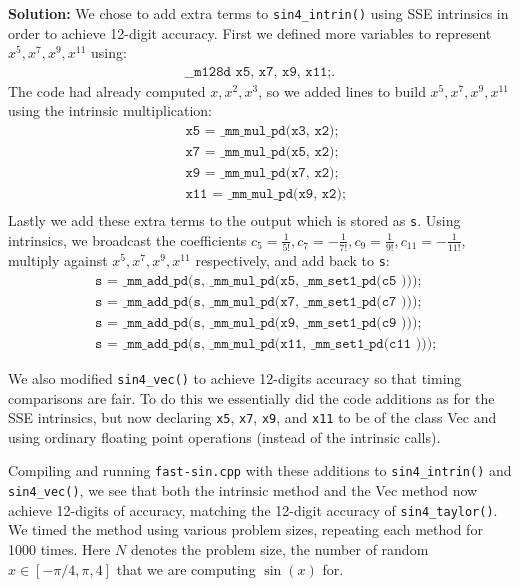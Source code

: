 \documentclass[10pt]{article}
\begin{document}
\begin{enumerate}
\textbf{Solution:} We chose to add extra terms to \texttt{sin4\_intrin()} using SSE intrinsics in order to achieve 12-digit accuracy. First we defined more variables to represent $x^{5}, x^{7}, x^{9}, x^{11}$ using:
\begin{align*}
\texttt{\_\_m128d x5, x7, x9, x11;}. 
\end{align*}
The code had already computed $x, x^{2}, x^{3}$, so we added lines to build $x^{5}, x^{7}, x^{9}, x^{11}$ using the intrinsic multiplication:
\begin{align*}
    &\texttt{x5  = \_mm\_mul\_pd(x3, x2);}\\
    &\texttt{x7  = \_mm\_mul\_pd(x5, x2);}\\
    &\texttt{x9  = \_mm\_mul\_pd(x7, x2);}\\
    &\texttt{x11 = \_mm\_mul\_pd(x9, x2);}\\
\end{align*}
Lastly we add these extra terms to the output which is stored as \texttt{s}. Using intrinsics, we broadcast the coefficients $c_{5} = \frac{1}{5!}, c_{7} = -\frac{1}{7!}, c_{9} = \frac{1}{9!}, c_{11} = -\frac{1}{11!}$, multiply against $x^{5}, x^{7}, x^{9}, x^{11}$ respectively, and add back to \texttt{s}:
\begin{align*}
    &\texttt{s = \_mm\_add\_pd(s, \_mm\_mul\_pd(x5,  \_mm\_set1\_pd(c5 )));}\\
    &\texttt{s = \_mm\_add\_pd(s, \_mm\_mul\_pd(x7,  \_mm\_set1\_pd(c7 )));}\\
    &\texttt{s = \_mm\_add\_pd(s, \_mm\_mul\_pd(x9,  \_mm\_set1\_pd(c9 )));}\\
    &\texttt{s = \_mm\_add\_pd(s, \_mm\_mul\_pd(x11,  \_mm\_set1\_pd(c11 )));}
\end{align*}

We also modified \texttt{sin4\_vec()} to achieve 12-digits accuracy so that timing comparisons are fair. To do this we essentially did the code additions as for the SSE intrinsics, but now declaring \texttt{x5}, \texttt{x7}, \texttt{x9}, and \texttt{x11} to be of the class Vec and using ordinary floating point operations (instead of the intrinsic calls).

Compiling and running \texttt{fast-sin.cpp} with these additions to \texttt{sin4\_intrin()} and \texttt{sin4\_vec()}, we see that both the intrinsic method and the Vec method now achieve 12-digits of accuracy, matching the 12-digit accuracy of \texttt{sin4\_taylor()}. We timed the method using various problem sizes, repeating each method for 1000 times. Here $N$ denotes the problem size, the number of random $x \in [-\pi/4, \pi,4]$ that we are computing $\sin (x)$ for. 


\end{enumerate}
\end{document}
